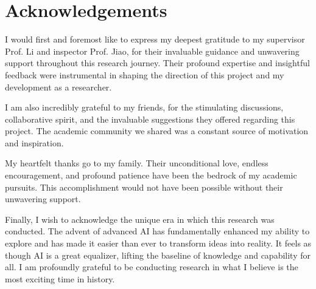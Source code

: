
\chapter*{Acknowledgements}

I would first and foremost like to express my deepest gratitude to my supervisor Prof. Li and inspector Prof. Jiao, for their invaluable guidance and unwavering support throughout this research journey. Their profound expertise and insightful feedback were instrumental in shaping the direction of this project and my development as a researcher.

I am also incredibly grateful to my friends, for the stimulating discussions, collaborative spirit, and the invaluable suggestions they offered regarding this project. The academic community we shared was a constant source of motivation and inspiration.

My heartfelt thanks go to my family. Their unconditional love, endless encouragement, and profound patience have been the bedrock of my academic pursuits. This accomplishment would not have been possible without their unwavering support.

Finally, I wish to acknowledge the unique era in which this research was conducted. The advent of advanced AI has fundamentally enhanced my ability to explore and has made it easier than ever to transform ideas into reality. It feels as though AI is a great equalizer, lifting the baseline of knowledge and capability for all. I am profoundly grateful to be conducting research in what I believe is the most exciting time in history.